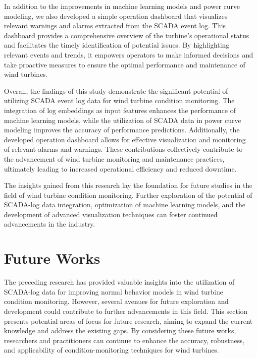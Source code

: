 In addition to the improvements in machine learning models and power curve modeling, we also developed a simple operation dashboard that visualizes 
relevant warnings and alarms extracted from the SCADA event log. 
This dashboard provides a comprehensive overview of the turbine's operational status and facilitates the timely identification of potential issues. 
By highlighting relevant events and trends, it empowers operators to make informed decisions and take proactive measures to ensure the optimal performance 
and maintenance of wind turbines. \par

Overall, the findings of this study demonstrate the significant potential of utilizing SCADA event log data for wind turbine condition monitoring. 
The integration of log embeddings as input features enhances the performance of machine learning models, while the utilization of SCADA data in power curve modeling 
improves the accuracy of performance predictions. 
Additionally, the developed operation dashboard allows for effective visualization and monitoring of relevant alarms and warnings. 
These contributions collectively contribute to the advancement of wind turbine monitoring and maintenance practices, ultimately leading to increased operational efficiency and reduced downtime. \par

The insights gained from this research lay the foundation for future studies in the field of wind turbine condition monitoring. 
Further exploration of the potential of SCADA-log data integration, optimization of machine learning models, and the development of advanced visualization techniques can foster continued advancements in the industry.

\section{Future Works}
\label{sec:future_works}

The preceding research has provided valuable insights into the utilization of SCADA-log data for improving normal behavior models in wind turbine condition monitoring. 
However, several avenues for future exploration and development could contribute to further advancements in this field. 
This section presents potential areas of focus for future research, aiming to expand the current knowledge and address the existing gaps. 
By considering these future works, researchers and practitioners can continue to enhance the accuracy, robustness, and applicability of condition-monitoring techniques for wind turbines.

